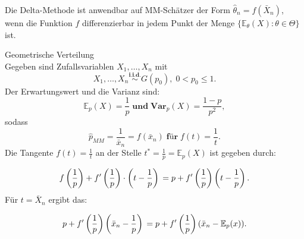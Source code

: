 \documentclass[10pt]{article}
\newcommand{\FZV}{X_1, \ldots, X_n} %
\newcommand{\EW}{\mathbb{E}} %
\newenvironment{BSP}[1][]
{\begin{Beispiel}[frametitle=#1]}{\end{Beispiel}}
\begin{document}
	\noindent Die Delta-Methode ist anwendbar auf MM-Schätzer der Form $\hat{\theta}_n = f(\bar{X}_n)$, wenn die Funktion $f$ differenzierbar in jedem Punkt der Menge $\{\EW_\theta(X) : \theta \in \Theta\}$ ist.
	
		\begin{BSP}[Beispiel 1.3.5 (Delta-Methode)]
		
		Geometrische Verteilung \\
		Gegeben sind Zufallsvariablen $\FZV$ mit
		\begin{equation*}
			\FZV \overset{\textbf{i.i.d.}}{\sim} G(p_0), \; 0 < p_0 \leq 1.
		\end{equation*} 
		Der Erwartungswert und die Varianz sind:
		\begin{equation*}
			\EW_p(X) = \frac{1}{p} \; \textbf{und} \;  \textbf{Var}_p(X) = \frac{1-p}{p^2},
		\end{equation*}
		sodass
		\begin{equation*}
			\hat{p}_{MM} = \frac{1}{\bar{x}_n} = f(\bar{x}_n) \; \textbf{für} \; f(t)= \frac{1}{t}.
		\end{equation*} 
		Die Tangente $f(t) = \frac{1}{t}$ an der Stelle $t^* = \frac{1}{p} = \EW_p(X)$ ist gegeben durch:
		
		\begin{equation*}
			f\left(\frac{1}{p}\right) + f'\left(\frac{1}{p}\right) \cdot \left(t-\frac{1}{p}\right)\\
			= p + f'\left(\frac{1}{p}\right) \left(t-\frac{1}{p}\right).
		\end{equation*}
		Für $t=\bar{X}_n$ ergibt das:
		
		\begin{equation*}
			p + f'\left(\frac{1}{p}\right) \left(\bar{x}_n - \frac{1}{p}\right) \\
			= p + f'\left(\frac{1}{p}\right) (\bar{x}_n - \EW_p(x)).
		\end{equation*}
		
	\end{BSP}
	
\end{document}
